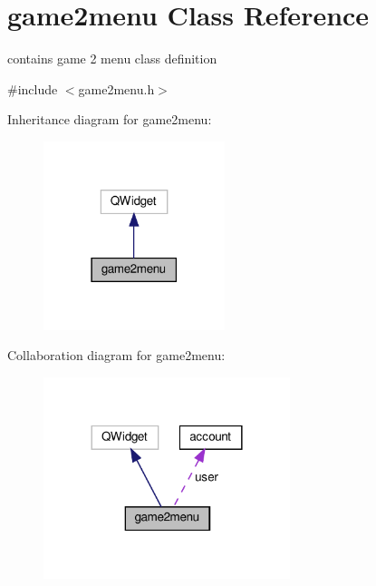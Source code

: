 \hypertarget{classgame2menu}{}\section{game2menu Class Reference}
\label{classgame2menu}


contains game 2 menu class definition  




{\ttfamily \#include $<$game2menu.\+h$>$}



Inheritance diagram for game2menu\+:\nopagebreak
\begin{figure}[H]
\begin{center}
\leavevmode
\includegraphics[width=150pt]{classgame2menu__inherit__graph}
\end{center}
\end{figure}


Collaboration diagram for game2menu\+:\nopagebreak
\begin{figure}[H]
\begin{center}
\leavevmode
\includegraphics[width=204pt]{classgame2menu__coll__graph}
\end{center}
\end{figure}
